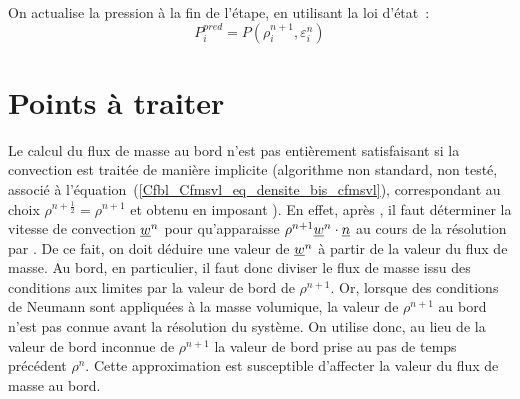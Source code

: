 On actualise la pression à la fin de l'étape, en utilisant la loi d'état~:
\begin{equation}
\displaystyle P_i^{pred}=P(\rho_i^{n+1},\varepsilon_i^{n})
\end{equation}


\section*{Points à traiter}
Le calcul du flux de masse au  bord n'est pas entièrement satisfaisant
si la convection est traitée de manière implicite
(algorithme non standard, non testé,
associé à l'équation~(\ref{Cfbl_Cfmsvl_eq_densite_bis_cfmsvl}),
correspondant au choix $\rho^{n+\frac{1}{2}}=\rho^{n+1}$ et
obtenu en imposant ).
En effet, après , il faut déterminer la vitesse de
convection $\underline{w}^n$ pour qu'apparaisse
$\rho^{n+1} \underline{w}^n\cdot\underline{n}$
au cours de la résolution par . De ce fait, on doit déduire
une valeur de $\underline{w}^n$ à partir de la valeur
du flux de masse. Au bord, en particulier, il faut
donc diviser le flux de masse
issu des conditions aux limites par la valeur de bord de $\rho^{n+1}$.
Or, lorsque des conditions de Neumann sont appliquées à la
masse volumique,
la valeur de $\rho^{n+1}$ au bord n'est pas connue avant la résolution du
système. On utilise donc, au lieu de la valeur de bord inconnue de
$\rho^{n+1}$ la valeur de bord prise au pas de temps
précédent $\rho^{n}$. Cette approximation est susceptible
d'affecter la valeur du flux de masse au bord.

